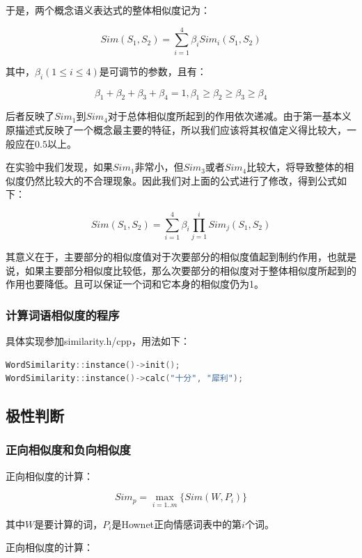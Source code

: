 \documentclass[11pt,a4paper]{article}
\begin{document}
于是，两个概念语义表达式的整体相似度记为：

\[
Sim(S_{1}, S_{2}) = \sum_{i=1}^4 \beta_{i}Sim_{i}(S_{1}, S_{2})
\]

其中，$\beta_{i}(1\leq i \leq 4)$是可调节的参数，且有：

\[
\beta_{1} + \beta_{2} + \beta_{3} + \beta_{4} = 1, \beta_{1} \geq \beta_{2} \geq \beta_{3} \geq \beta_{4}
\]

后者反映了$Sim_{1}$到$Sim_{4}$对于总体相似度所起到的作用依次递减。由于第一基本义原描述式反映了一个概念最主要的特征，所以我们应该将其权值定义得比较大，一般应在$0.5$以上。

在实验中我们发现，如果$Sim_{1}$非常小，但$Sim_{3}$或者$Sim_{4}$比较大，将导致整体的相似度仍然比较大的不合理现象。因此我们对上面的公式进行了修改，得到公式如下：

\[
Sim(S_{1}, S_{2}) = \sum_{i=1}^4 \beta_{i}\prod_{j=1}^i Sim_{j}(S_{1}, S_{2})
\]

其意义在于，主要部分的相似度值对于次要部分的相似度值起到制约作用，也就是说，如果主要部分相似度比较低，那么次要部分的相似度对于整体相似度所起到的作用也要降低。且可以保证一个词和它本身的相似度仍为1。

\subsubsection{计算词语相似度的程序}

具体实现参加similarity.h/cpp，用法如下：\vspace{6pt}

{\scriptsize\begin{lstlisting}[language=C] 
WordSimilarity::instance()->init();
WordSimilarity::instance()->calc("十分", "犀利");
\end{lstlisting}}

\subsection{极性判断}

\subsubsection{正向相似度和负向相似度}


正向相似度的计算：

\[
Sim_{p} = \max_{i=1..m}\{Sim(W, P_{i})\}
\]

其中$W$是要计算的词，$P_{i}$是Hownet正向情感词表中的第$i$个词。


正向相似度的计算：
\end{document}
